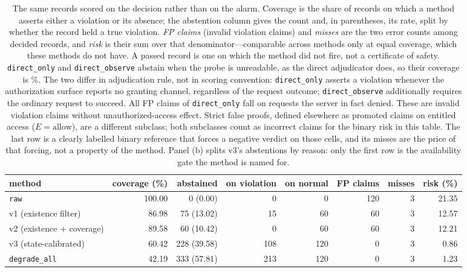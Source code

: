 \begin{table}[t]
\centering
\caption{The same \CvgN{} records scored on the decision rather than on the alarm. Coverage is the share of records on which a method asserts either a violation or its absence; the abstention column gives the count and, in parentheses, its rate, split by whether the record held a true violation. \emph{FP claims} (invalid violation claims) and \emph{misses} are the two error counts among decided records, and \emph{risk} is their sum over that denominator---comparable across methods only at equal coverage, which these methods do not have. A passed record is one on which the method did not fire, not a certificate of safety. \texttt{direct\_only} and \texttt{direct\_observe} abstain when the probe is unreadable, as the direct adjudicator does, so their coverage is \CvgObsCoveragePct{}\%. The two differ in adjudication rule, not in scoring convention: \texttt{direct\_only} asserts a violation whenever the authorization surface reports no granting channel, regardless of the request outcome; \texttt{direct\_observe} additionally requires the ordinary request to succeed. All \CvgDirOnlyFP{} FP claims of \texttt{direct\_only} fall on requests the server in fact denied. These are invalid violation claims without unauthorized-access effect. Strict false proofs, defined elsewhere as promoted claims on entitled access ($E{=}\mathrm{allow}$), are a different subclass; both subclasses count as incorrect claims for the binary risk in this table. The last row is a clearly labelled binary reference that forces a negative verdict on those cells, and its misses are the price of that forcing, not a property of the method. Panel (b) splits v3's abstentions by reason: only the first row is the availability gate the method is named for.}
\label{tab:coverage}
\small
\setlength{\tabcolsep}{4pt}
\begin{tabular}{@{}p{}rrrrrrr@{}}
\toprule
method & coverage (\%) & abstained & on violation & on normal & FP claims & misses & risk (\%) \\
\midrule
\texttt{raw} & 100.00 & 0 (0.00) & 0 & 0 & 120 & 3 & 21.35 \\
v1 (existence filter) & 86.98 & 75 (13.02) & 15 & 60 & 60 & 3 & 12.57 \\
v2 (existence + coverage) & 89.58 & 60 (10.42) & 0 & 60 & 60 & 3 & 12.21 \\
v3 (state-calibrated) & 60.42 & 228 (39.58) & 108 & 120 & 0 & 3 & 0.86 \\
\texttt{degrade\_all} & 42.19 & 333 (57.81) & 213 & 120 & 0 & 3 & 1.23 \\

\end{tabular}
\end{table}
